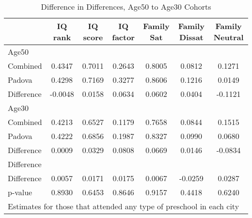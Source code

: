 \begin{table}[htbp]\centering
\caption{Difference in Differences, Age50 to Age30 Cohorts}
\begin{tabular}{l*{6}{c}}
\hline\hline
            &     IQ rank&    IQ score&   IQ factor&  Family Sat&Family Dissat&Family Neutral\\
\hline
Age50       &            &            &            &            &            &            \\
Combined    &      0.4347&      0.7011&      0.2643&      0.8005&      0.0812&      0.1271\\
Padova      &      0.4298&      0.7169&      0.3277&      0.8606&      0.1216&      0.0149\\
Difference  &     -0.0048&      0.0158&      0.0634&      0.0602&      0.0404&     -0.1121\\
\hline
Age30       &            &            &            &            &            &            \\
Combined    &      0.4213&      0.6527&      0.1179&      0.7658&      0.0844&      0.1515\\
Padova      &      0.4222&      0.6856&      0.1987&      0.8327&      0.0990&      0.0680\\
Difference  &      0.0009&      0.0329&      0.0808&      0.0669&      0.0146&     -0.0834\\
\hline
Difference  &            &            &            &            &            &            \\
Difference  &      0.0057&      0.0171&      0.0175&      0.0067&     -0.0259&      0.0287\\
p-value     &      0.8930&      0.6453&      0.8646&      0.9157&      0.4418&      0.6240\\
\hline\hline
\multicolumn{7}{l}{\footnotesize Estimates for those that attended any type of preschool in each city}\\
\end{tabular}
\end{table}
